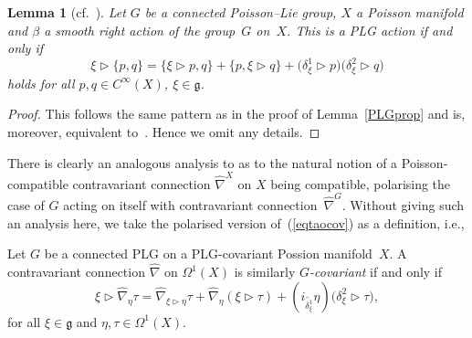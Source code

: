 \documentclass[pdftex]{sigma}
\numberwithin{equation}{section}
\newtheorem{Lemma}[Theorem]{Lemma}
\newcommand{\<}{{\langle}}
\renewcommand{\>}{{\rangle}}
\newcommand{\la}{{\triangleright}}
\newcommand{\cg}{{\mathfrak{g}}}
\begin{document}
\begin{Lemma}[{cf.~\cite[p.~54]{KS}}]\label{PLGactionprop}
Let $G$ be a connected Poisson--Lie group, $X$ a Poisson manifold and $\beta$ a smooth right action of the group~$G$ on~$X$. This is a PLG action if and only if
 \begin{equation}\label{eqPLGactionprop}
\xi\triangleright\lbrace p,q\rbrace=\lbrace \xi\triangleright p,q\rbrace+\lbrace p,\xi\triangleright q\rbrace+\big(\delta_\xi^1\triangleright p\big)\big(\delta_\xi^2\triangleright q\big)
\end{equation}
holds for all $p,q\in C^\infty(X)$, $\xi\in \cg$. \end{Lemma}
\begin{proof} This follows the same pattern as in the proof of Lemma~\ref{PLGprop} and is, moreover, equivalent to~\cite[p.~54]{KS}. Hence we omit any details.
\end{proof}

There is clearly an analogous analysis to \cite{BegMa:sem} as to the natural notion of a Poisson-compatible contravariant connection $\hat\nabla^X$ on $X$ being compatible, polarising the case of $G$ acting on itself with contravariant connection~$\hat\nabla^G$. Without giving such an analysis here, we take the polarised version of~(\ref{eqtaocov}) as a definition, i.e.,
\begin{Definition}\label{concovX} Let $G$ be a connected PLG on a PLG-covariant Possion manifold~$X$. A contravariant connection $\hat\nabla$ on $\Omega^1(X)$ is similarly {\em $G$-covariant} if and only if
\begin{equation}\label{eq2concovX}
\xi\la\hat{\nabla}_{\eta}\tau=\hat{\nabla}_{\xi\la\eta}\tau+\hat{\nabla}_{\eta}(\xi\la\tau)+(i_{\tilde{\delta_\xi^1}}\eta) \big(\delta_\xi^2\la\tau\big),
\end{equation}
for all $\xi\in \cg$ and $\eta,\tau\in \Omega^1(X)$.
\end{Definition}
\end{document}

